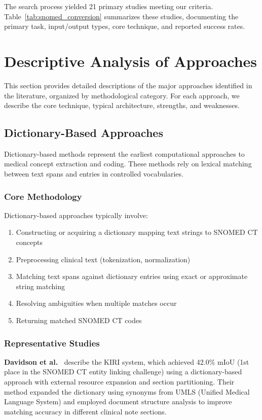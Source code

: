 The search process yielded 21 primary studies meeting our criteria. Table~\ref{tab:snomed_conversion} summarizes these studies, documenting the primary task, input/output types, core technique, and reported success rates.

\section{Descriptive Analysis of Approaches}

This section provides detailed descriptions of the major approaches identified in the literature, organized by methodological category. For each approach, we describe the core technique, typical architecture, strengths, and weaknesses.

\subsection{Dictionary-Based Approaches}

Dictionary-based methods represent the earliest computational approaches to medical concept extraction and coding. These methods rely on lexical matching between text spans and entries in controlled vocabularies.

\subsubsection{Core Methodology}

Dictionary-based approaches typically involve:
\begin{enumerate}
    \item Constructing or acquiring a dictionary mapping text strings to SNOMED CT concepts
    \item Preprocessing clinical text (tokenization, normalization)
    \item Matching text spans against dictionary entries using exact or approximate string matching
    \item Resolving ambiguities when multiple matches occur
    \item Returning matched SNOMED CT codes
\end{enumerate}

\subsubsection{Representative Studies}

\textbf{Davidson et al.\ \cite{Davidson:2025}} describe the KIRI system, which achieved 42.0\% mIoU (1st place in the SNOMED CT entity linking challenge) using a dictionary-based approach with external resource expansion and section partitioning. Their method expanded the dictionary using synonyms from UMLS (Unified Medical Language System) and employed document structure analysis to improve matching accuracy in different clinical note sections.\\

